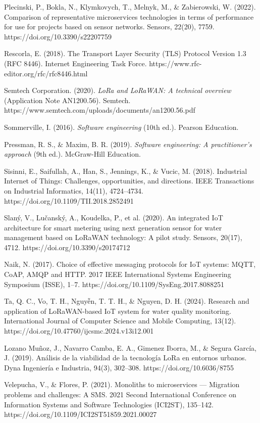 \documentclass[12pt,a4paper,oneside]{report}
\begin{document}
Plecinski, P., Bokla, N., Klymkovych, T., Melnyk, M., \& Zabierowski, W. (2022). Comparison of representative microservices technologies in terms of performance for use for projects based on sensor networks. Sensors, 22(20), 7759. https://doi.org/10.3390/s22207759

Rescorla, E. (2018). The Transport Layer Security (TLS) Protocol Version 1.3 (RFC 8446). Internet Engineering Task Force. https://www.rfc-editor.org/rfc/rfc8446.html

Semtech Corporation. (2020). \textit{LoRa and LoRaWAN: A technical overview} (Application Note AN1200.56). Semtech. https://www.semtech.com/uploads/documents/an1200.56.pdf

Sommerville, I. (2016). \textit{Software engineering} (10th ed.). Pearson Education.

Pressman, R. S., \& Maxim, B. R. (2019). \textit{Software engineering: A practitioner's approach} (9th ed.). McGraw-Hill Education.

Sisinni, E., Saifullah, A., Han, S., Jennings, K., \& Vucic, M. (2018). Industrial Internet of Things: Challenges, opportunities, and directions. IEEE Transactions on Industrial Informatics, 14(11), 4724--4734. https://doi.org/10.1109/TII.2018.2852491

Slaný, V., Lučanský, A., Koudelka, P., et al. (2020). An integrated IoT architecture for smart metering using next generation sensor for water management based on LoRaWAN technology: A pilot study. Sensors, 20(17), 4712. https://doi.org/10.3390/s20174712

Naik, N. (2017). Choice of effective messaging protocols for IoT systems: MQTT, CoAP, AMQP and HTTP. 2017 IEEE International Systems Engineering Symposium (ISSE), 1--7. https://doi.org/10.1109/SysEng.2017.8088251

Ta, Q. C., Vo, T. H., Nguyễn, T. T. H., \& Nguyen, D. H. (2024). Research and application of LoRaWAN-based IoT system for water quality monitoring. International Journal of Computer Science and Mobile Computing, 13(12). https://doi.org/10.47760/ijcsmc.2024.v13i12.001

Lozano Muñoz, J., Navarro Camba, E. A., Gimenez Iborra, M., \& Segura García, J. (2019). Análisis de la viabilidad de la tecnología LoRa en entornos urbanos. Dyna Ingeniería e Industria, 94(3), 302--308. https://doi.org/10.6036/8755

Velepucha, V., \& Flores, P. (2021). Monoliths to microservices --- Migration problems and challenges: A SMS. 2021 Second International Conference on Information Systems and Software Technologies (ICI2ST), 135--142. https://doi.org/10.1109/ICI2ST51859.2021.00027
\end{document}
